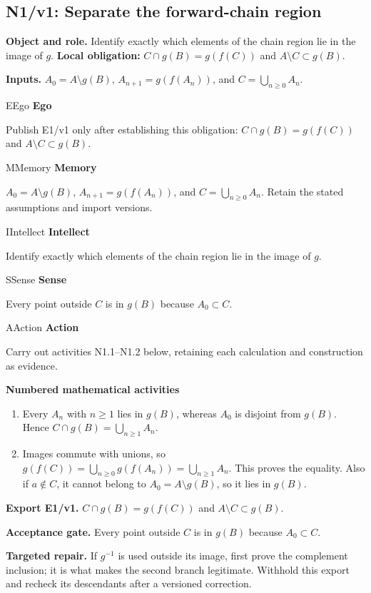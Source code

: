 \documentclass[preprint,12pt,aps,pra,showkeys,amsmath,amssymb,superscriptaddress,floatfix]{revtex4-2}
\theoremstyle{definition}
\theoremstyle{remark}
\newcommand{\mmfaculty}[3]{%
 \begin{mmfacultybox}{#1}{#2}
 {\sffamily\bfseries\color{MMBlue}#2}\par\smallskip #3
 \end{mmfacultybox}}
\newcommand{\field}[2]{\par\smallskip\noindent\textbf{#1.} #2\par}
\begin{document}
\subsection{N1/v1: Separate the forward-chain region}

\field{Object and role}{Identify exactly which elements of the chain region lie in the image of
\(g\). \textbf{Local obligation:} \(C\cap g(B)=g(f(C))\) and
\(A\setminus C\subset g(B)\).}

\field{Inputs}{\(A_0=A\setminus g(B)\), \(A_{n+1}=g(f(A_n))\), and
\(C=\bigcup_{n\ge0}A_n\).}

\mmfaculty{E}{Ego}{Publish E1/v1 only after establishing this obligation:
\(C\cap g(B)=g(f(C))\) and \(A\setminus C\subset g(B)\).}

\mmfaculty{M}{Memory}{\(A_0=A\setminus g(B)\), \(A_{n+1}=g(f(A_n))\), and
\(C=\bigcup_{n\ge0}A_n\). Retain the stated assumptions and import
versions.}

\mmfaculty{I}{Intellect}{Identify exactly which elements of the chain region lie in the image of
\(g\).}

\mmfaculty{S}{Sense}{Every point outside \(C\) is in \(g(B)\) because \(A_0\subset C\).}

\mmfaculty{A}{Action}{Carry out activities N1.1--N1.2 below, retaining each calculation and
construction as evidence.}

\smallskip\noindent\textbf{Numbered mathematical activities}

\begin{enumerate}[label=N1.\arabic*,leftmargin=3.4em]

\item Every \(A_n\) with \(n\ge1\) lies in \(g(B)\), whereas \(A_0\) is
disjoint from \(g(B)\). Hence \(C\cap g(B)=\bigcup_{n\ge1}A_n\).

\item Images commute with unions, so
\(g(f(C))=\bigcup_{n\ge0}g(f(A_n))=\bigcup_{n\ge1}A_n\). This proves the
equality. Also if \(a\notin C\), it cannot belong to
\(A_0=A\setminus g(B)\), so it lies in \(g(B)\).

\end{enumerate}

\field{Export E1/v1}{\(C\cap g(B)=g(f(C))\) and \(A\setminus C\subset g(B)\).}

\field{Acceptance gate}{Every point outside \(C\) is in \(g(B)\) because \(A_0\subset C\).}

\field{Targeted repair}{If \(g^{-1}\) is used outside its image, first prove the complement
inclusion; it is what makes the second branch legitimate. Withhold this
export and recheck its descendants after a versioned correction.}
\end{document}

